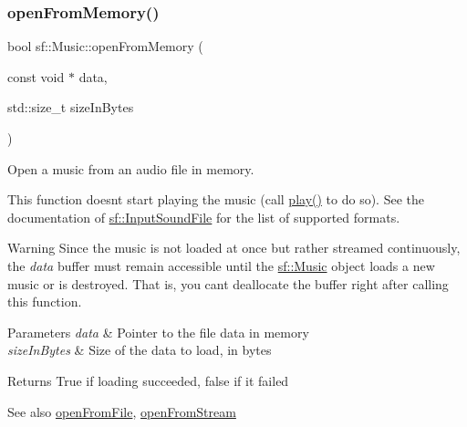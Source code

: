 \subsubsection{\texorpdfstring{open\+From\+Memory()}{openFromMemory()}}
{\footnotesize\ttfamily bool sf\+::\+Music\+::open\+From\+Memory (\begin{DoxyParamCaption}\item[{const void $\ast$}]{data,  }\item[{std\+::size\+\_\+t}]{size\+In\+Bytes }\end{DoxyParamCaption})}



Open a music from an audio file in memory. 

This function doesn\textquotesingle{}t start playing the music (call \hyperlink{classsf_1_1_sound_stream_afdc08b69cab5f243d9324940a85a1144}{play()} to do so). See the documentation of \hyperlink{classsf_1_1_input_sound_file}{sf\+::\+Input\+Sound\+File} for the list of supported formats.

\begin{DoxyWarning}{Warning}
Since the music is not loaded at once but rather streamed continuously, the {\itshape data} buffer must remain accessible until the \hyperlink{classsf_1_1_music}{sf\+::\+Music} object loads a new music or is destroyed. That is, you can\textquotesingle{}t deallocate the buffer right after calling this function.
\end{DoxyWarning}

\begin{DoxyParams}{Parameters}
{\em data} & Pointer to the file data in memory \\
\hline
{\em size\+In\+Bytes} & Size of the data to load, in bytes\\
\hline
\end{DoxyParams}
\begin{DoxyReturn}{Returns}
True if loading succeeded, false if it failed
\end{DoxyReturn}
\begin{DoxySeeAlso}{See also}
\hyperlink{classsf_1_1_music_a3edc66e5f5b3f11e84b90eaec9c7d7c0}{open\+From\+File}, \hyperlink{classsf_1_1_music_a4e55d1910a26858b44778c26b237d673}{open\+From\+Stream} 
\end{DoxySeeAlso}
\mbox{\label{classsf_1_1_music_a4e55d1910a26858b44778c26b237d673}} 
